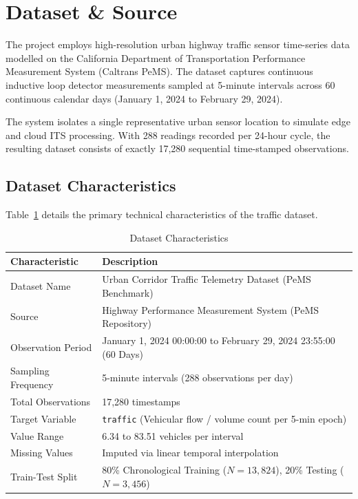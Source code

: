 \documentclass[12pt,a4paper]{article}
\begin{document}
\section{Dataset \& Source}
The project employs high-resolution urban highway traffic sensor time-series data modelled on the California Department of Transportation Performance Measurement System (Caltrans PeMS). The dataset captures continuous inductive loop detector measurements sampled at 5-minute intervals across 60 continuous calendar days (January 1, 2024 to February 29, 2024).

The system isolates a single representative urban sensor location to simulate edge and cloud ITS processing. With 288 readings recorded per 24-hour cycle, the resulting dataset consists of exactly 17,280 sequential time-stamped observations.

\subsection{Dataset Characteristics}
Table~\ref{tab:dataset_char} details the primary technical characteristics of the traffic dataset.

\begin{table}[H]
    \centering
    \caption{Dataset Characteristics}
    \label{tab:dataset_char}
    \renewcommand{\arraystretch}{1.3}
    \begin{tabular}{|l|p{9.5cm}|}
        \hline
        \textbf{Characteristic} & \textbf{Description} \\
        \hline
        Dataset Name & Urban Corridor Traffic Telemetry Dataset (PeMS Benchmark) \\
        \hline
        Source & Highway Performance Measurement System (PeMS Repository) \\
        \hline
        Observation Period & January 1, 2024 00:00:00 to February 29, 2024 23:55:00 (60 Days) \\
        \hline
        Sampling Frequency & 5-minute intervals (288 observations per day) \\
        \hline
        Total Observations & 17,280 timestamps \\
        \hline
        Target Variable & \texttt{traffic} (Vehicular flow / volume count per 5-min epoch) \\
        \hline
        Value Range & 6.34 to 83.51 vehicles per interval \\
        \hline
        Missing Values & Imputed via linear temporal interpolation \\
        \hline
        Train-Test Split & 80\% Chronological Training ($N=13,824$), 20\% Testing ($N=3,456$) \\
        \hline
    \end{tabular}
\end{table}
\end{document}
